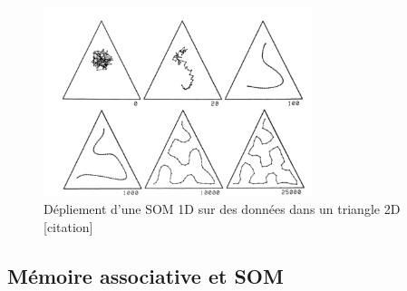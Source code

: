 \begin{figure}
\centering
\includegraphics[width=0.7\textwidth]{som1d}
\caption{Dépliement d'une SOM 1D sur des données dans un triangle 2D [citation] \label{fig:som1d}}

\end{figure}

\subsection{Mémoire associative et SOM}

